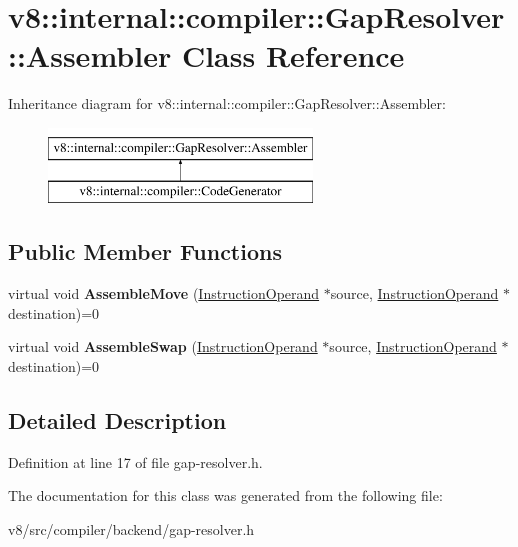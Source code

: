 \hypertarget{classv8_1_1internal_1_1compiler_1_1GapResolver_1_1Assembler}{}\section{v8\+:\+:internal\+:\+:compiler\+:\+:Gap\+Resolver\+:\+:Assembler Class Reference}
\label{classv8_1_1internal_1_1compiler_1_1GapResolver_1_1Assembler}
Inheritance diagram for v8\+:\+:internal\+:\+:compiler\+:\+:Gap\+Resolver\+:\+:Assembler\+:\begin{figure}[H]
\begin{center}
\leavevmode
\includegraphics[height=2.000000cm]{classv8_1_1internal_1_1compiler_1_1GapResolver_1_1Assembler}
\end{center}
\end{figure}
\subsection*{Public Member Functions}
\begin{DoxyCompactItemize}
\item 
\mbox{\label{classv8_1_1internal_1_1compiler_1_1GapResolver_1_1Assembler_a6a0e6dc1f86df92f38d770fa454cce9a}} 
virtual void {\bfseries Assemble\+Move} (\mbox{\hyperlink{classv8_1_1internal_1_1compiler_1_1InstructionOperand}{Instruction\+Operand}} $\ast$source, \mbox{\hyperlink{classv8_1_1internal_1_1compiler_1_1InstructionOperand}{Instruction\+Operand}} $\ast$destination)=0
\item 
\mbox{\label{classv8_1_1internal_1_1compiler_1_1GapResolver_1_1Assembler_aa4de0477b384c6559df4c875323ae3ee}} 
virtual void {\bfseries Assemble\+Swap} (\mbox{\hyperlink{classv8_1_1internal_1_1compiler_1_1InstructionOperand}{Instruction\+Operand}} $\ast$source, \mbox{\hyperlink{classv8_1_1internal_1_1compiler_1_1InstructionOperand}{Instruction\+Operand}} $\ast$destination)=0
\end{DoxyCompactItemize}


\subsection{Detailed Description}


Definition at line 17 of file gap-\/resolver.\+h.



The documentation for this class was generated from the following file\+:\begin{DoxyCompactItemize}
\item 
v8/src/compiler/backend/gap-\/resolver.\+h\end{DoxyCompactItemize}
